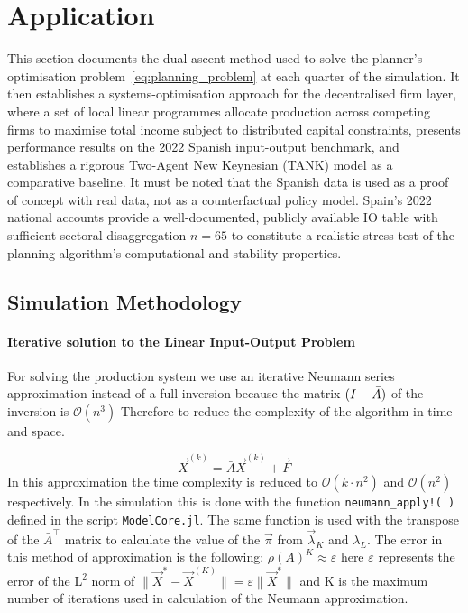 \section{Application}
\label{sec:application}

This section documents the dual ascent method
used to solve the planner's optimisation problem~\eqref{eq:planning_problem}
at each quarter of the simulation.
It then establishes a systems-optimisation approach for the decentralised firm layer, where a set of local
linear programmes allocate production across competing firms to maximise total income
subject to distributed capital constraints, presents performance results on the 
2022 Spanish input-output benchmark, and establishes a rigorous Two-Agent New Keynesian (TANK) model as a comparative baseline.
It must be noted that the Spanish data is used as a proof of concept with real data, not as a counterfactual policy model.
Spain's 2022 national accounts provide a well-documented, publicly available IO table with sufficient sectoral disaggregation $n = 65$ to constitute a realistic stress test of the planning algorithm's computational and stability properties.

\subsection{Simulation Methodology}
\label{subsec:methodology}


\paragraph{Iterative solution to the Linear Input-Output Problem}

For solving the production system we use an iterative Neumann series approximation instead of a full inversion because the matrix $(I- \bar{A})\\$ of the inversion is $\mathcal{O}(n^3)$ Therefore to reduce the complexity of the algorithm in time and space.

\begin{equation}\label{eq:Iderative inversion}
    \vec{X}^{(k)} = \bar{A}\vec{X}^{(k)} + \vec{F}
\end{equation}
In this approximation the time complexity is reduced to $\mathcal{O}(k \cdot n^2)$ and $\mathcal{O}(n^2)$ respectively.
In the simulation this is done with the function \texttt{neumann\_apply!(  )} defined in the script \texttt{ModelCore.jl}.
The same function is used with the transpose of the $\bar{A}^{\top}$ matrix to calculate the value of the $\vec{\pi}$ from $\vec{\lambda}_{K}$ and $\lambda_{L}$.
The error in this method of approximation is the following: $\rho(A)^{K} \approx \varepsilon $ here $\varepsilon$ represents the error of the $\text{L}^{2}$ norm of $
\| \vec{X}^{*} - \vec{X}^{(K)}\| = \varepsilon \| \vec{X}^{*} \|
$ and $\text{K}$ is the maximum number of iterations used in calculation of the Neumann approximation.


